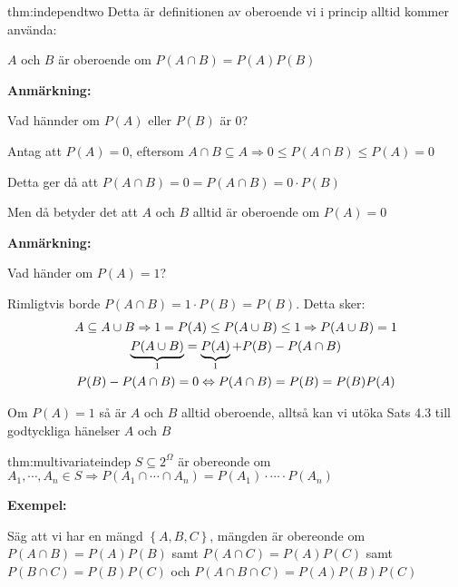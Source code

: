 \par\bigskip
\begin{theo}{thm:independtwo}
  Detta är definitionen av oberoende vi i princip alltid kommer använda:\par
  \noindent $A$ och $B$ är oberoende om $P(A\cap B) = P(A)P(B)$
\end{theo}
\par\bigskip
\noindent\textbf{Anmärkning:}\par
\noindent Vad hännder om $P(A)$ eller $P(B)$ är 0?\par
\noindent Antag att $P(A) = 0$, eftersom $A\cap B\subseteq A\Rightarrow 0\leq P(A\cap B)\leq P(A) = 0$\par
\noindent Detta ger då att $P(A\cap B) = 0 = P(A\cap B) = 0\cdot P(B)$\par
\noindent Men då betyder det att $A$ och $B$ alltid är oberoende om $P(A) = 0$
\par\bigskip
\noindent\textbf{Anmärkning:}\par
\noindent Vad händer om $P(A) = 1$?\par
\noindent Rimligtvis borde $P(A\cap B) = 1\cdot P(B) = P(B)$. Detta sker:
\begin{equation*}
  \begin{gathered}
    A\subseteq A\cup B\Rightarrow 1 = P(A)\leq P(A\cup B)\leq 1\Rightarrow P(A\cup B) = 1\\
    \underbrace{P(A\cup B)}_{\text{1}} = \underbrace{P(A)}_{\text{1}}+P(B)-P(A\cap B)\\
    P(B)-P(A\cap B) = 0\Leftrightarrow P(A\cap B) = P(B) = P(B)P(A)
  \end{gathered}
\end{equation*}
\par\bigskip
\noindent Om $P(A) = 1$ så är $A$ och $B$ alltid oberoende, alltså kan vi utöka Sats 4.3 till godtyckliga hänelser $A$ och $B$
\par\bigskip
\begin{theo}{thm:multivariateindep}
  $S\subseteq 2^{\Omega}$ är obereonde om $A_1,\cdots, A_n\in S\Rightarrow P(A_1\cap\cdots\cap A_n) = P(A_1)\cdot\cdots\cdot P(A_n)$
\end{theo}
\par\bigskip
\noindent\textbf{Exempel:}\par
\noindent Säg att vi har en mängd $\left\{A,B,C\right\}$, mängden är obereonde om $P(A\cap B) = P(A)P(B)$ samt $P(A\cap C) = P(A)P(C)$ samt $P(B\cap C) = P(B)P(C)$ och $P(A\cap B\cap C) = P(A)P(B)P(C)$\par
